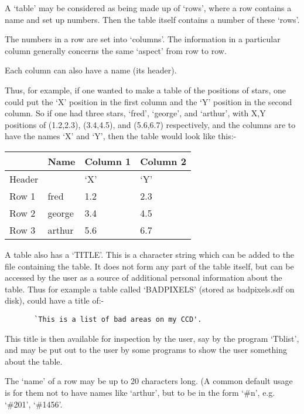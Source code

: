 A `table' may be considered as being made up of `rows', where a row
contains a name and set up numbers. Then the table itself contains a
number of these `rows'.

The numbers in a row are set into `columns'. The information in a
particular column generally concerns the same `aspect' from row to
row.

Each column can also have a name (its header).

Thus, for example, if one wanted to make a table of the positions of
stars, one could put the `X' position in the first column and the `Y'
position in the second column. So if one had three stars, `fred',
`george', and `arthur', with X,Y positions of (1.2,2.3), (3.4,4.5), and
(5.6,6.7) respectively, and the columns are to have the names `X' and
`Y', then the table would look like this:-

\hspace{4ex} \begin{tabular}[c]{|l|l|l|l|} \hline
	  &  Name       & Column 1    & Column 2  \\ \hline Header
   &             &  `X'        &  `Y'      \\ \hline Row 1  &
   fred       &  1.2        &  2.3      \\ Row 2  &  george     &
   3.4        &  4.5      \\ Row 3  &  arthur     &  5.6        &
   6.7      \\ \hline \end{tabular}

A table also has a `TITLE'. This is a character string which can be
added to the file containing the table. It does not form any part of
the table itself, but can be accessed by the user as a source of
additional personal information about the table. Thus for example a
table called `BADPIXELS' (stored as badpixels.sdf on disk), could have
a title of:-

\begin{verbatim}
       `This is a list of bad areas on my CCD'.  \end{verbatim}

This title is then available for inspection by the user, say by the
program `Tblist', and may be put out to the user by some programs to
show the user something about the table.

The `name' of a row may be up to 20 characters long. (A common default
usage is for them not to have names like `arthur', but to be in the
form `\#n', e.g.  `\#201', `\#1456'.

